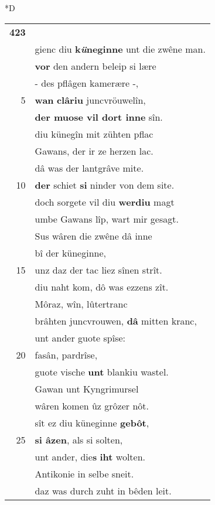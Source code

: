 \documentclass[8pt,a4paper,notitlepage]{article}
\begin{document}
\begin{table}[ht]
\begin{minipage}[t]{0.5\linewidth}
\small
\begin{center}*D
\end{center}
\begin{tabular}{rl}
\textbf{423} & \textit{\begin{large}I\end{large}}n die kemenâten sân\\ 
 & gienc diu \textbf{k\textit{ü}neginne} unt die zwêne man.\\ 
 & \textbf{vor} den andern beleip si lære\\ 
 & - des pflâgen kamerære -,\\ 
5 & \textbf{wan} \textbf{clâriu} juncvröuwelîn,\\ 
 & \textbf{der muose vil dort inne} sîn.\\ 
 & diu künegîn mit zühten pflac\\ 
 & Gawans, der ir ze herzen lac.\\ 
 & dâ was der lantgrâve mite.\\ 
10 & \textbf{der} schiet \textbf{si} ninder von dem site.\\ 
 & doch sorgete vil diu \textbf{werdiu} magt\\ 
 & umbe Gawans lîp, wart mir gesagt.\\ 
 & Sus wâren die zwêne dâ inne\\ 
 & bî der küneginne,\\ 
15 & unz daz der tac liez sînen strît.\\ 
 & diu naht kom, dô was ezzens zît.\\ 
 & Môraz, wîn, lûtertranc\\ 
 & brâhten juncvrouwen, \textbf{dâ} mitten kranc,\\ 
 & unt ander guote spîse:\\ 
20 & fasân, pardrîse,\\ 
 & guote vische \textbf{unt} blankiu wastel.\\ 
 & Gawan unt Kyngrimursel\\ 
 & wâren komen ûz grôzer nôt.\\ 
 & sît ez diu küneginne \textbf{gebôt},\\ 
25 & \textbf{si âzen}, als si solten,\\ 
 & unt ander, die\textbf{s} \textbf{iht} wolten.\\ 
 & Antikonie in selbe sneit.\\ 
 & daz was durch zuht in bêden leit.\\ 

\end{tabular}
\end{minipage}
\end{table}
\end{document}
